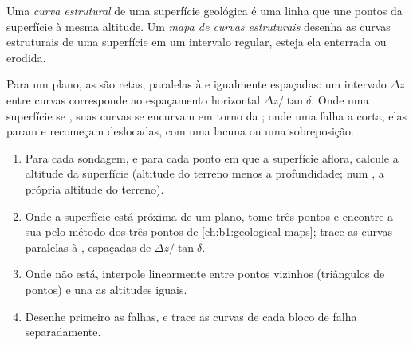 \begin{definition}\label{def:b1:cross-sections:structure-contour}
Uma \emph{curva estrutural} de uma superfície geológica é uma linha que une pontos da superfície à mesma altitude. Um \emph{mapa de curvas estruturais} desenha as curvas estruturais de uma superfície em um intervalo regular, esteja ela enterrada ou erodida.
\end{definition}

Para um plano, as  são retas, paralelas à  e igualmente espaçadas: um intervalo $\Delta z$ entre curvas corresponde ao espaçamento horizontal $\Delta z/\tan\delta$. Onde uma superfície se , suas curvas se encurvam em torno da ; onde uma falha a corta, elas param e recomeçam deslocadas, com uma lacuna ou uma sobreposição.

\begin{method}\label{met:b1:cross-sections:structure-contours}
\begin{enumerate}
  \item Para cada sondagem, e para cada ponto em que a superfície aflora, calcule a altitude da superfície (altitude do terreno menos a profundidade; num , a própria altitude do terreno).
  \item Onde a superfície está próxima de um plano, tome três pontos e encontre a sua  pelo método dos três pontos de \cref{ch:b1:geological-maps}; trace as curvas paralelas à , espaçadas de $\Delta z/\tan\delta$.
  \item Onde não está, interpole linearmente entre pontos vizinhos (triângulos de pontos) e una as altitudes iguais.
  \item Desenhe primeiro as falhas, e trace as curvas de cada bloco de falha separadamente.
\end{enumerate}
\end{method}


